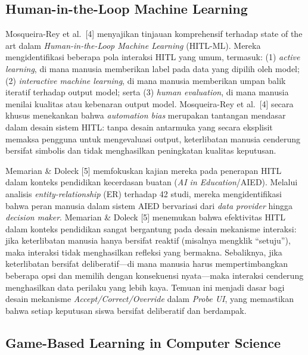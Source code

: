 \documentclass[12pt,oneside]{report}
\begin{document}
\subsection{Human-in-the-Loop Machine Learning}
\label{subsec:penelitian-hitl-ml}

Mosqueira-Rey et al.\ [4] menyajikan tinjauan komprehensif terhadap state of the art dalam \textit{Human-in-the-Loop Machine Learning} (HITL-ML). Mereka mengidentifikasi beberapa pola interaksi HITL yang umum, termasuk: (1) \textit{active learning}, di mana manusia memberikan label pada data yang dipilih oleh model; (2) \textit{interactive machine learning}, di mana manusia memberikan umpan balik iteratif terhadap output model; serta (3) \textit{human evaluation}, di mana manusia menilai kualitas atau kebenaran output model. Mosqueira-Rey et al.\ [4] secara khusus menekankan bahwa \textit{automation bias} merupakan tantangan mendasar dalam desain sistem HITL: tanpa desain antarmuka yang secara eksplisit memaksa pengguna untuk mengevaluasi output, keterlibatan manusia cenderung bersifat simbolis dan tidak menghasilkan peningkatan kualitas keputusan.

Memarian \& Doleck [5] memfokuskan kajian mereka pada penerapan HITL dalam konteks pendidikan kecerdasan buatan (\textit{AI in Education}/AIED). Melalui analisis \textit{entity-relationship} (ER) terhadap 42 studi, mereka mengidentifikasi bahwa peran manusia dalam sistem AIED bervariasi dari \textit{data provider} hingga \textit{decision maker}. Memarian \& Doleck [5] menemukan bahwa efektivitas HITL dalam konteks pendidikan sangat bergantung pada desain mekanisme interaksi: jika keterlibatan manusia hanya bersifat reaktif (misalnya mengklik ``setuju''), maka interaksi tidak menghasilkan refleksi yang bermakna. Sebaliknya, jika keterlibatan bersifat deliberatif---di mana manusia harus mempertimbangkan beberapa opsi dan memilih dengan konsekuensi nyata---maka interaksi cenderung menghasilkan data perilaku yang lebih kaya. Temuan ini menjadi dasar bagi desain mekanisme \textit{Accept/Correct/Override} dalam \textit{Probe UI}, yang memastikan bahwa setiap keputusan siswa bersifat deliberatif dan berdampak.

\subsection{Game-Based Learning in Computer Science}
\label{subsec:penelitian-gbl-cs}
\end{document}

